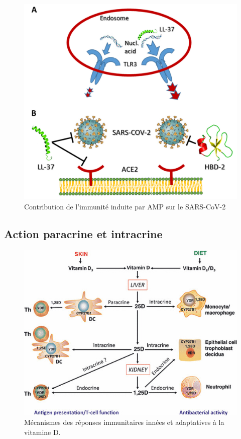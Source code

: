 \documentclass[
  a4paper,
  DIV=11,
  numbers=noendperiod,
  listof=totoc]{scrreprt}
\begin{document}
\begin{figure}

{\centering \includegraphics{figures/vd-amp.png}

}

\caption{Contribution de l'immunité induite par AMP sur le SARS-CoV-2}

\end{figure}

\hypertarget{action-paracrine-et-intracrine}{%
\subsection{Action paracrine et
intracrine}\label{action-paracrine-et-intracrine}}

\begin{figure}

{\centering \includegraphics{figures/meca-intracrine.jpg}

}

\caption{Mécanismes des réponses immunitaires innées et adaptatives à la
vitamine D.}

\end{figure}
\end{document}
